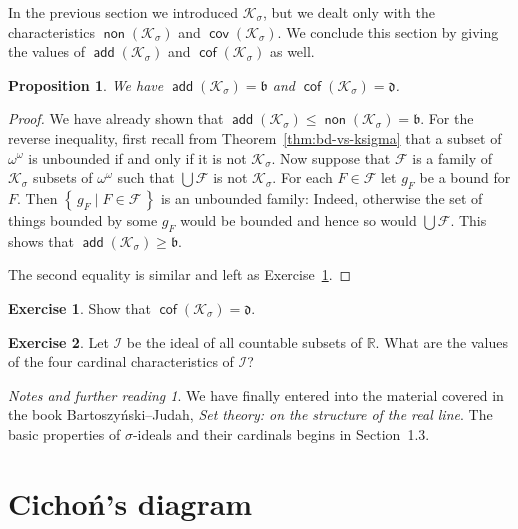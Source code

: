 \documentclass[11pt,oneside,a4paper]{amsbook}
\newcommand{\set}[1]{\left\{\,#1\,\right\}}
\newcommand{\R}{\mathbb R}
\newcommand{\Ksigma}{\mathcal K_\sigma}
\DeclareMathOperator{\add}{\mathsf{add}}
\DeclareMathOperator{\non}{\mathsf{non}}
\DeclareMathOperator{\cov}{\mathsf{cov}}
\DeclareMathOperator{\cof}{\mathsf{cof}}
\theoremstyle{definition}
\newtheorem{exercise}{Exercise}[section]
\theoremstyle{plain}
\newtheorem{proposition}[theorem]{Proposition}
\theoremstyle{definition}
\theoremstyle{remark}
\newtheorem*{notes}{Notes and further reading}
\numberwithin{equation}{section}
\numberwithin{figure}{section}
\begin{document}
In the previous section we introduced $\Ksigma$, but we dealt only with the characteristics $\non(\Ksigma)$ and $\cov(\Ksigma)$. We conclude this section by giving the values of $\add(\Ksigma)$ and $\cof(\Ksigma)$ as well.

\begin{proposition}
  We have $\add(\Ksigma)=\mathfrak b$ and $\cof(\Ksigma)=\mathfrak d$.
\end{proposition}

\begin{proof}
  We have already shown that $\add(\Ksigma)\leq\non(\Ksigma)=\mathfrak b$. For the reverse inequality, first recall from Theorem~\ref{thm:bd-vs-ksigma} that a subset of $\omega^\omega$ is unbounded if and only if it is not $\Ksigma$. Now suppose that $\mathcal F$ is a family of $\Ksigma$ subsets of $\omega^\omega$ such that $\bigcup\mathcal F$ is not $\Ksigma$. For each $F\in\mathcal F$ let $g_F$ be a bound for $F$. Then $\set{g_F\mid F\in\mathcal F}$ is an unbounded family: Indeed, otherwise the set of things bounded by some $g_F$ would be bounded and hence so would $\bigcup\mathcal F$. This shows that $\add(\Ksigma)\geq\mathfrak b$.

The second equality is similar and left as Exercise~\ref{exerc:non-ksigma-d}.
\end{proof}

\begin{exercise}
  \label{exerc:non-ksigma-d}
  Show that $\cof(\Ksigma)=\mathfrak d$.
\end{exercise}

\begin{exercise}
  Let $\mathcal I$ be the ideal of all countable subsets of $\R$. What are the values of the four cardinal characteristics of $\mathcal I$?
\end{exercise}

\begin{notes}
  We have finally entered into the material covered in the book Bartoszy\'nski--Judah, \emph{Set theory: on the structure of the real line}. The basic properties of $\sigma$-ideals and their cardinals begins in Section~1.3.
\end{notes}


\newpage
\section{Cicho\'n's diagram}
\end{document}
